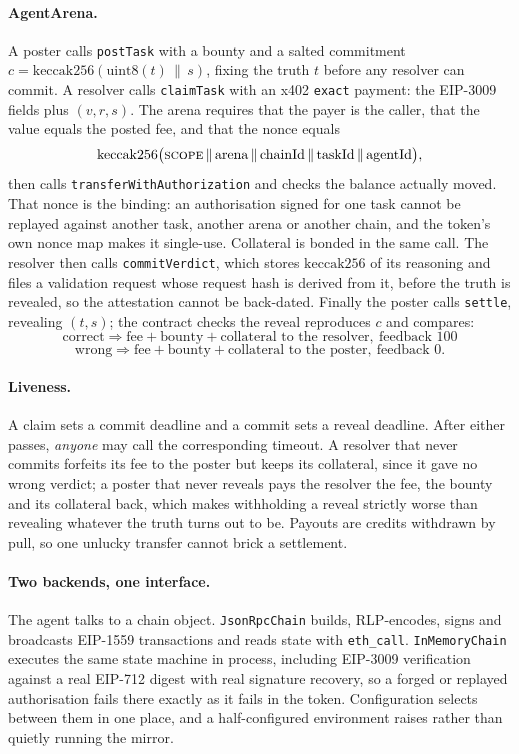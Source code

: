 \documentclass[10pt,twocolumn]{article}
\begin{document}
\paragraph{AgentArena.} A poster calls \texttt{postTask} with a bounty and a salted
commitment $c = \mathrm{keccak256}(\mathrm{uint8}(t) \,\|\, s)$, fixing the truth $t$ before
any resolver can commit. A resolver calls \texttt{claimTask} with an x402 \texttt{exact}
payment: the EIP-3009 fields plus $(v,r,s)$. The arena requires that the payer is the
caller, that the value equals the posted fee, and that the nonce equals
\[
\mathrm{keccak256}\big(\textsc{scope} \,\|\, \text{arena} \,\|\, \text{chainId} \,\|\,
\text{taskId} \,\|\, \text{agentId}\big),
\]
then calls \texttt{transferWithAuthorization} and checks the balance actually moved. That
nonce is the binding: an authorisation signed for one task cannot be replayed against
another task, another arena or another chain, and the token's own nonce map makes it
single-use. Collateral is bonded in the same call. The resolver then calls
\texttt{commitVerdict}, which stores $\mathrm{keccak256}$ of its reasoning and files a
validation request whose request hash is derived from it, before the truth is revealed, so
the attestation cannot be back-dated. Finally the poster calls \texttt{settle}, revealing
$(t,s)$; the contract checks the reveal reproduces $c$ and compares:
\[
\text{correct} \Rightarrow \text{fee} + \text{bounty} + \text{collateral to the resolver},\
\text{feedback } 100
\]
\[
\text{wrong} \Rightarrow \text{fee} + \text{bounty} + \text{collateral to the poster},\
\text{feedback } 0.
\]

\paragraph{Liveness.} A claim sets a commit deadline and a commit sets a reveal deadline.
After either passes, \emph{anyone} may call the corresponding timeout. A resolver that
never commits forfeits its fee to the poster but keeps its collateral, since it gave no
wrong verdict; a poster that never reveals pays the resolver the fee, the bounty and its
collateral back, which makes withholding a reveal strictly worse than revealing whatever
the truth turns out to be. Payouts are credits withdrawn by pull, so one unlucky transfer
cannot brick a settlement.

\paragraph{Two backends, one interface.} The agent talks to a chain object.
\texttt{JsonRpcChain} builds, RLP-encodes, signs and broadcasts EIP-1559 transactions and
reads state with \texttt{eth\_call}. \texttt{InMemoryChain} executes the same state machine
in process, including EIP-3009 verification against a real EIP-712 digest with real
signature recovery, so a forged or replayed authorisation fails there exactly as it fails
in the token. Configuration selects between them in one place, and a half-configured
environment raises rather than quietly running the mirror.
\end{document}
